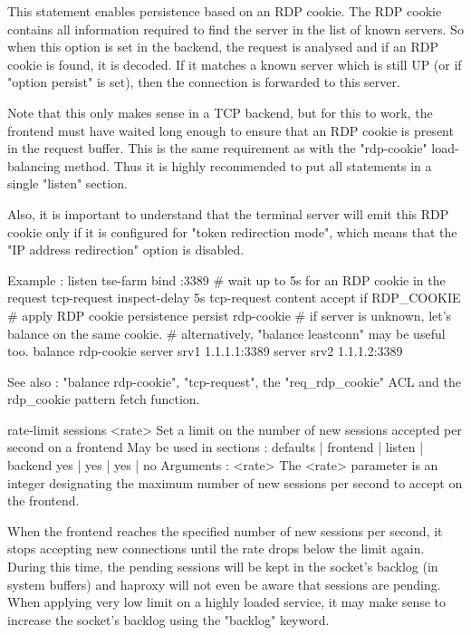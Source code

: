   This statement enables persistence based on an RDP cookie. The RDP cookie
  contains all information required to find the server in the list of known
  servers. So when this option is set in the backend, the request is analysed
  and if an RDP cookie is found, it is decoded. If it matches a known server
  which is still UP (or if "option persist" is set), then the connection is
  forwarded to this server.

  Note that this only makes sense in a TCP backend, but for this to work, the
  frontend must have waited long enough to ensure that an RDP cookie is present
  in the request buffer. This is the same requirement as with the "rdp-cookie"
  load-balancing method. Thus it is highly recommended to put all statements in
  a single "listen" section.

  Also, it is important to understand that the terminal server will emit this
  RDP cookie only if it is configured for "token redirection mode", which means
  that the "IP address redirection" option is disabled.

  Example :
        listen tse-farm
            bind :3389
            # wait up to 5s for an RDP cookie in the request
            tcp-request inspect-delay 5s
            tcp-request content accept if RDP_COOKIE
            # apply RDP cookie persistence
            persist rdp-cookie
            # if server is unknown, let's balance on the same cookie.
            # alternatively, "balance leastconn" may be useful too.
            balance rdp-cookie
            server srv1 1.1.1.1:3389
            server srv2 1.1.1.2:3389

  See also : "balance rdp-cookie", "tcp-request", the "req_rdp_cookie" ACL and
  the rdp_cookie pattern fetch function.


rate-limit sessions <rate>
  Set a limit on the number of new sessions accepted per second on a frontend
  May be used in sections :   defaults | frontend | listen | backend
                                 yes   |    yes   |   yes  |   no
  Arguments :
    <rate>    The <rate> parameter is an integer designating the maximum number
              of new sessions per second to accept on the frontend.

  When the frontend reaches the specified number of new sessions per second, it
  stops accepting new connections until the rate drops below the limit again.
  During this time, the pending sessions will be kept in the socket's backlog
  (in system buffers) and haproxy will not even be aware that sessions are
  pending. When applying very low limit on a highly loaded service, it may make
  sense to increase the socket's backlog using the "backlog" keyword.

